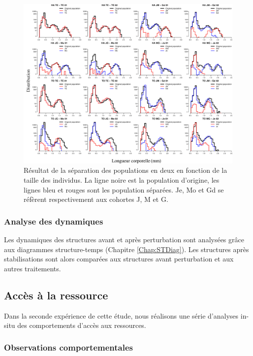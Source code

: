 \begin{figure}[!ht]
\begin{center}
\includegraphics[width=1\textwidth]{1_CorpsDeThese/Resumes/Fig/SM01}
\caption[Séparation des
populations]{Résultat de la séparation des populations en deux en fonction de
la taille des individus. La ligne noire est la population d'origine, les lignes
bleu et rouges sont les population séparées. Je, Mo et Gd se réfèrent
respectivement aux cohortes J, M et G.}
\label{fig:SM1}
\end{center}
\end{figure}
\subsubsection{Analyse des dynamiques}

Les dynamiques des structures avant et après perturbation sont analysées grâce
aux diagrammes structure-temps (Chapitre \ref{Chap:STDiag}). Les structures
après stabilisations sont alors comparées aux structures avant perturbation et
aux autres traitements. 

\subsection{Accès à la ressource}

Dans la seconde expérience de cette étude, nous réalisons une série d'analyses
in-situ des comportements d'accès aux ressources.

\subsubsection{Observations comportementales}


